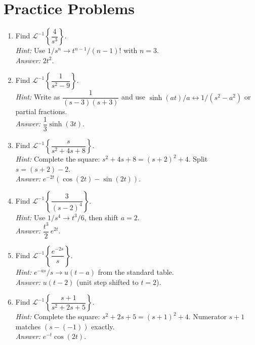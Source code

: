 \documentclass[12pt,a4paper]{article}
\begin{document}
\section{Practice Problems}

\begin{enumerate}

\item Find $\mathcal{L}^{-1}\!\left\{\dfrac{4}{s^3}\right\}$.\\
\textit{Hint:} Use $1/s^n \to t^{n-1}/(n-1)!$ with $n=3$.\\
\textit{Answer:} $2t^2$.

\item Find $\mathcal{L}^{-1}\!\left\{\dfrac{1}{s^2-9}\right\}$.\\
\textit{Hint:} Write as $\dfrac{1}{(s-3)(s+3)}$ and use $\sinh(at)/a \leftrightarrow 1/(s^2-a^2)$
or partial fractions.\\
\textit{Answer:} $\dfrac{1}{3}\sinh(3t)$.

\item Find $\mathcal{L}^{-1}\!\left\{\dfrac{s}{s^2+4s+8}\right\}$.\\
\textit{Hint:} Complete the square: $s^2+4s+8=(s+2)^2+4$.
Split $s = (s+2)-2$.\\
\textit{Answer:} $e^{-2t}\!\left(\cos(2t) - \sin(2t)\right)$.

\item Find $\mathcal{L}^{-1}\!\left\{\dfrac{3}{(s-2)^4}\right\}$.\\
\textit{Hint:} Use $1/s^4 \to t^3/6$, then shift $a=2$.\\
\textit{Answer:} $\dfrac{t^3}{2}\,e^{2t}$.

\item Find $\mathcal{L}^{-1}\!\left\{\dfrac{e^{-2s}}{s}\right\}$.\\
\textit{Hint:} $e^{-as}/s \to u(t-a)$ from the standard table.\\
\textit{Answer:} $u(t-2)$ (unit step shifted to $t=2$).

\item Find $\mathcal{L}^{-1}\!\left\{\dfrac{s+1}{s^2+2s+5}\right\}$.\\
\textit{Hint:} Complete the square: $s^2+2s+5=(s+1)^2+4$.
Numerator $s+1$ matches $(s-(-1))$ exactly.\\
\textit{Answer:} $e^{-t}\cos(2t)$.

\end{enumerate}
\end{document}
